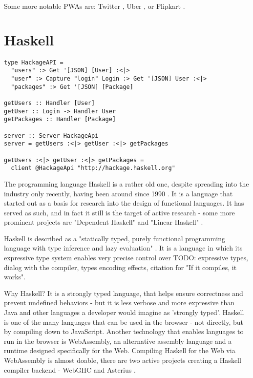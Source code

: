 \documentclass[english,odsaz]{fitthesis}
\begin{document}
Some more notable PWAs are: Twitter \cite{twitter}, Uber \cite{uber}, or Flipkart
\cite{flipkart}.

\section{Haskell}
\label{sec:org9c0e83e}
\begin{verbatim}
type HackageAPI =
  "users" :> Get '[JSON] [User] :<|>
  "user" :> Capture "login" Login :> Get '[JSON] User :<|>
  "packages" :> Get '[JSON] [Package]

getUsers :: Handler [User]
getUser :: Login -> Handler User
getPackages :: Handler [Package]

server :: Server HackageApi
server = getUsers :<|> getUser :<|> getPackages

getUsers :<|> getUser :<|> getPackages =
  client @HackageApi "http://hackage.haskell.org"
\end{verbatim}

The programming language Haskell is a rather old one, despite spreading into the
industry only recently, having been around since 1990 \cite{haskell_history}. It
is a language that started out as a basis for research into the design of
functional languages. It has served as such, and in fact it still is the target
of active research - some more prominent projects are "Dependent Haskell"
\cite{eisenberg2016dependent} and "Linear Haskell" \cite{bernardy2017linear}.

Haskell is described as a "statically typed, purely functional programming
language with type inference and lazy evaluation" \cite{jones2003haskell}. It is a language
in which its expressive type system enables very precise control over TODO:
expressive types, dialog with the compiler, types encoding effects, citation for
"If it compiles, it works".

Why Haskell? It is a strongly typed language, that helps ensure correctness and
prevent undefined behaviors - but it is less verbose and more expressive than
Java and other languages a developer would imagine as 'strongly typed'. Haskell
is one of the many languages that can be used in the browser - not directly, but
by compiling down to JavaScript. Another technology that enables languages to
run in the browser is WebAssembly, an alternative assembly language and a
runtime designed specifically for the Web. Compiling Haskell for the Web via
WebAssembly is almost doable, there are two active projects creating a Haskell
compiler backend - WebGHC \cite{webghc} and Asterius \cite{asterius}.
\end{document}
